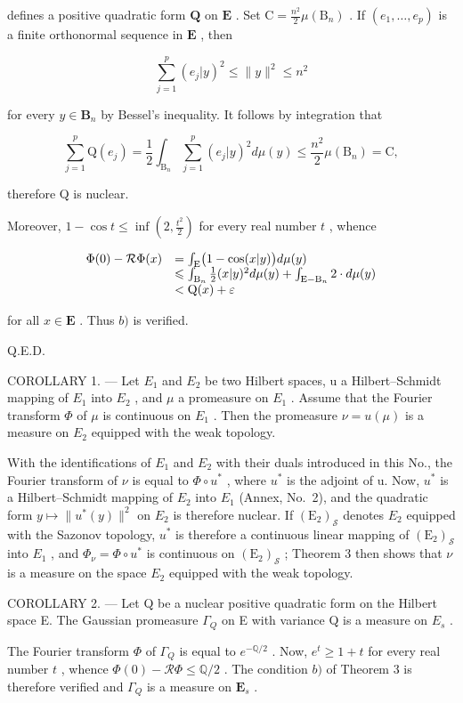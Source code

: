 defines a positive quadratic form \(\mathbf{Q}\) on \(\mathbf{E}\) . Set \(\mathrm{C} = \frac{n^2}{2}\mu (\mathrm{B}_n)\) . If \((e_1,\ldots ,e_p)\) is a finite orthonormal sequence in \(\mathbf{E}\) , then

\[
\sum_ {j = 1} ^ {p} (e _ {j} | y) ^ {2} \leqslant \| y \| ^ {2} \leqslant n ^ {2}
\]

for every \(y \in \mathbf{B}_n\) by Bessel's inequality. It follows by integration that

\[
\sum_ {j = 1} ^ {p} \mathrm{Q} (e _ {j}) = \frac {1}{2} \int_ {\mathrm{B} _ {n}} \sum_ {j = 1} ^ {p} (e _ {j} | y) ^ {2} d \mu (y) \leqslant \frac {n ^ {2}}{2} \mu (\mathrm{B} _ {n}) = \mathrm{C},
\]

therefore Q is nuclear.

Moreover, \(1 - \cos t \leqslant \inf \left(2, \frac{t^2}{2}\right)\) for every real number \(t\) , whence

\[
\begin{array}{r l} \Phi (0) - \mathcal {R} \Phi (x) & = \int_ {\mathrm{E}} \bigl (1 - \cos (x | y) \bigr) d \mu (y) \\ & \leqslant \int_ {\mathrm{B} _ {n}} \frac {1}{2} (x | y) ^ {2} d \mu (y) + \int_ {\mathrm{E} - \mathrm{B} _ {n}} 2 \cdot d \mu (y) \\ & <   \mathrm{Q} (x) + \varepsilon \end{array}
\]

for all \(x \in \mathbf{E}\) . Thus \(b)\) is verified.

Q.E.D.

COROLLARY 1. --- Let \(E_{1}\) and \(E_{2}\) be two Hilbert spaces, u a Hilbert--Schmidt mapping of \(E_{1}\) into \(E_{2}\) , and \(\mu\) a promeasure on \(E_{1}\) . Assume that the Fourier transform \(\Phi\) of \(\mu\) is continuous on \(E_{1}\) . Then the promeasure \(\nu = u(\mu)\) is a measure on \(E_{2}\) equipped with the weak topology.

With the identifications of \(E_{1}\) and \(E_{2}\) with their duals introduced in this No., the Fourier transform of \(\nu\) is equal to \(\Phi\circ u^{*}\) , where \(u^{*}\) is the adjoint of u. Now, \(u^{*}\) is a Hilbert--Schmidt mapping of \(E_{2}\) into \(E_{1}\) (Annex, No.~2), and the quadratic form \(y\mapsto\|u^{*}(y)\|^{2}\) on \(E_{2}\) is therefore nuclear. If \((\mathrm{E}_{2})_{\mathcal{S}}\) denotes \(E_{2}\) equipped with the Sazonov topology, \(u^{*}\) is therefore a continuous linear mapping of \((\mathrm{E}_{2})_{\mathcal{S}}\) into \(E_{1}\) , and \(\Phi_{\nu}=\Phi\circ u^{*}\) is continuous on \((\mathrm{E}_{2})_{\mathcal{S}}\) ; Theorem 3 then shows that \(\nu\) is a measure on the space \(E_{2}\) equipped with the weak topology.

COROLLARY 2. --- Let Q be a nuclear positive quadratic form on the Hilbert space E. The Gaussian promeasure \(\Gamma_{Q}\) on E with variance Q is a measure on \(E_{s}\) .

The Fourier transform \(\Phi\) of \(\Gamma_{Q}\) is equal to \(e^{-\mathbb{Q} / 2}\) . Now, \(e^t \geqslant 1 + t\) for every real number \(t\) , whence \(\Phi(0) - \mathcal{R}\Phi \leqslant \mathbb{Q} / 2\) . The condition \(b)\) of Theorem 3 is therefore verified and \(\Gamma_{Q}\) is a measure on \(\mathbf{E}_s\) .


